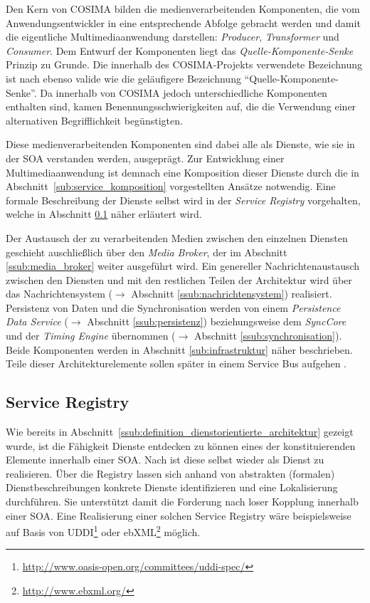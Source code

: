   Den Kern von COSIMA bilden die medienverarbeitenden Komponenten, die vom Anwendungsentwickler in eine entsprechende Abfolge gebracht werden und damit die eigentliche Multimediaanwendung darstellen: \emph{Producer}, \emph{Transformer} und \emph{Consumer}. Dem Entwurf der Komponenten liegt das \emph{Quelle-Komponente-Senke} Prinzip zu Grunde. Die innerhalb des COSIMA-Projekts verwendete Bezeichnung ist nach \citep{a_multimedia_component_kit,multimedia_component_frameworks} ebenso valide wie die geläufigere Bezeichnung "`Quelle-Komponente-Senke"'. Da innerhalb von COSIMA jedoch unterschiedliche Komponenten enthalten sind, kamen Benennungsschwierigkeiten auf, die die Verwendung einer alternativen Begrifflichkeit begünstigten.
  
  Diese medienverarbeitenden Komponenten sind dabei alle als Dienste, wie sie in der SOA verstanden werden, ausgeprägt. Zur Entwicklung einer Multimediaanwendung ist demnach eine Komposition dieser Dienste durch die in Abschnitt~\ref{sub:service_komposition} vorgestellten Ansätze notwendig. Eine formale Beschreibung der Dienste selbst wird in der \emph{Service Registry} vorgehalten, welche in Abschnitt \ref{sub:service_registry} näher erläutert wird.
  
  Der Austausch der zu verarbeitenden Medien zwischen den einzelnen Diensten geschieht auschließlich über den \emph{Media Broker}, der im Abschnitt \ref{ssub:media_broker} weiter ausgeführt wird. Ein genereller Nachrichtenaustausch zwischen den Diensten und mit den restlichen Teilen der Architektur wird über das Nachrichtensystem ($\to$ Abschnitt \ref{ssub:nachrichtensystem}) realisiert. Persistenz von Daten und die Synchronisation werden von einem \emph{Persistence Data Service} ($\to$ Abschnitt \ref{ssub:persistenz}) beziehungsweise dem \emph{SyncCore} und der \emph{Timing Engine} übernommen ($\to$ Abschnitt \ref{ssub:synchronisation}). Beide Komponenten werden in Abschnitt \ref{sub:infrastruktur} näher beschrieben. Teile dieser Architekturelemente sollen später in einem Service Bus aufgehen \citep[S. 18]{bericht}.


\subsection{Service Registry} %
\label{sub:service_registry}

  Wie bereits in Abschnitt~\ref{ssub:definition_dienstorientierte_architektur} gezeigt wurde, ist die Fähigkeit Dienste entdecken zu können eines der konstituierenden Elemente innerhalb einer SOA. Nach \citep{service_oriented_computing} ist diese selbst wieder als Dienst zu realisieren. Über die Registry lassen sich anhand von abstrakten (formalen) Dienstbeschreibungen konkrete Dienste identifizieren und eine Lokalisierung durchführen. Sie unterstützt damit die Forderung nach loser Kopplung innerhalb einer SOA. Eine Realisierung einer solchen Service Registry wäre beispielsweise auf Basis von UDDI\footnote{\url{http://www.oasis-open.org/committees/uddi-spec/}} oder ebXML\footnote{\url{http://www.ebxml.org/}} möglich.

